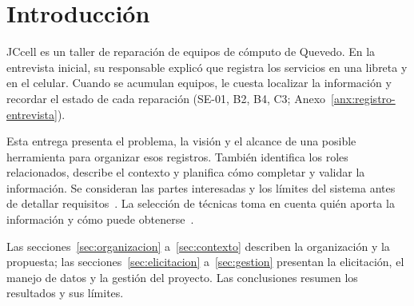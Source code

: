 \section{Introducción}\label{sec:introduccion}

JC\textbar{}cell es un taller de reparación de equipos de cómputo de Quevedo. En la entrevista
inicial, su responsable explicó que registra los servicios en una libreta y en el celular.
Cuando se acumulan equipos, le cuesta localizar la información y recordar el estado de cada
reparación (SE-01, B2, B4, C3; Anexo~\ref{anx:registro-entrevista}).

Esta entrega presenta el problema, la visión y el alcance de una posible herramienta para
organizar esos registros. También identifica los roles relacionados, describe el contexto y
planifica cómo completar y validar la información. Se consideran las partes interesadas y los
límites del sistema antes de detallar requisitos~\cite{iso29148}. La selección de técnicas toma
en cuenta quién aporta la información y cómo puede obtenerse~\cite{pohl2025,ireb2026}.

Las secciones~\ref{sec:organizacion} a~\ref{sec:contexto} describen la organización y la propuesta;
las secciones~\ref{sec:elicitacion} a~\ref{sec:gestion} presentan la elicitación, el manejo de
datos y la gestión del proyecto. Las conclusiones resumen los resultados y sus límites.
